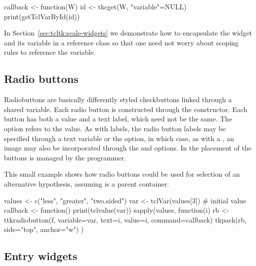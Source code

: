 \begin{Schunk}
\begin{Sinput}
 callback <- function(W) {
   id <- tkcget(W, "variable"=NULL)
   print(getTclVarById(id))
 }
\end{Sinput}
\end{Schunk}


In Section~\ref{sec:tcltk:scale-widgets} we demonstrate how to encapsulate the widget and its
variable in a reference class so that one need not worry about scoping
rules to reference the variable. 


\subsection{Radio buttons}
\label{sec:tcltk:radio-buttons}

Radiobuttons are basically differently styled checkbuttons linked through a shared \TCL\/
variable. Each radio button is constructed through the
 constructor. Each button has both a value and
a text label, which need not be the same. The
 option refers to the
value. As with labels, the radio button labels may be specified
through a text variable or the  option,
in which case, as with a , an image may also be
incorporated through the  and
 options. In \TK\/ the placement of
the buttons is managed by the programmer.


This small example shows how radio buttons could be used for selection
of an alternative hypothesis, assuming  is a parent container.

\begin{Schunk}
\begin{Sinput}
 values <- c("less", "greater", "two.sided")
 var <- tclVar(values[3])                # initial value
 callback <- function() print(tclvalue(var))
 sapply(values, function(i) {
   rb <- ttkradiobutton(f, variable=var, 
                        text=i, value=i, 
                        command=callback)
   tkpack(rb, side="top", anchor="w")
 })
\end{Sinput}
\end{Schunk}

\subsection{Entry widgets}
\label{sec:tcltk:entry-widgets}


